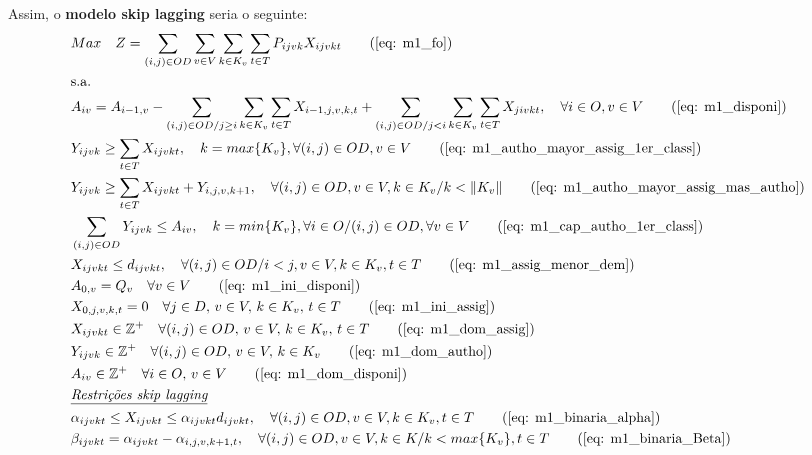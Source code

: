Assim, o \textbf{modelo skip lagging} seria o seguinte:
\allowdisplaybreaks
\begin{align}
	& Max \quad Z = \sum_{(i,j)\in OD} \sum_{v\in V} \sum_{k\in K_v} \sum_{t\in T} P_{ijvk} X_{ijvkt}     \tag{\ref{eq: m1_fo}}   \\
	& \text{s.a.}  \notag \\
	& A_{iv} = A_{i-1,v} - \sum_{(i,j) \in OD/j \geq i} \sum_{k\in K_v}\sum_{t\in T}X_{i-1,j,v,k,t} + \sum_{(i,j) \in OD/j<i} \sum_{k\in K_v}\sum_{t\in T}X_{jivkt}, \quad \forall i \in O, v \in V   \tag{\ref{eq: m1_disponi}} \\
	& Y_{ijvk} \geq  \sum_{t \in T} X_{ijvkt},  \quad k = max\{K_v\}, \forall(i,j) \in OD ,v \in V     \tag{\ref{eq: m1_autho_mayor_assig_1er_class}} \\
	& Y_{ijvk} \geq  \sum_{t \in T} X_{ijvkt} + Y_{i,j,v,k + 1} , \quad \forall(i,j) \in OD, v \in V, k \in K_v / k < \lVert K_v \rVert   \tag{\ref{eq: m1_autho_mayor_assig_mas_autho}} \\
	& \sum_{(i,j) \in OD} Y_{ijvk} \leq A_{iv}, \quad  k = min\{K_v\}, \forall i \in O / (i,j) \in OD,   \forall v \in V       \tag{\ref{eq: m1_cap_autho_1er_class}} \\
	& X_{ijvkt} \leq d_{ijvkt},  \quad \forall (i,j) \in OD / i < j  ,v \in V, k \in K_v, t\in T   \tag{\ref{eq: m1_assig_menor_dem}} \\
	& A_{0,v} = Q_v \quad \forall v \in V  \tag{\ref{eq: m1_ini_disponi}} \\ 
	& X_{0,j,v,k,t} = 0 \quad \forall j \in D,\, v \in V,\, k \in K_v,\, t \in T  \tag{\ref{eq: m1_ini_assig}} \\ 
	& X_{ijvkt} \in \mathbb{Z}^+ \quad \forall(i,j) \in OD,\, v \in V,\, k \in K_v,\, t \in T  \tag{\ref{eq: m1_dom_assig}} \\ 
	& Y_{ijvk} \in \mathbb{Z}^+ \quad \forall(i,j) \in OD,\, v \in V,\, k \in K_v  \tag{\ref{eq: m1_dom_autho}} \\ 
	& A_{iv} \in \mathbb{Z}^+ \quad \forall i \in O,\, v \in V  \tag{\ref{eq: m1_dom_disponi}} \\
	& \textit{\underline{Restrições skip lagging}}         \notag   \\
	& \alpha_{ijvkt} \leq X_{ijvkt} \leq \alpha_{ijvkt}d_{ijvkt}, \quad   \forall(i,j) \in OD, v \in V, k \in K_v, t \in T   \tag{\ref{eq: m1_binaria_alpha}} \\
	& \beta_{ijvkt} = \alpha_{ijvkt} - \alpha_{i,j,v,k+1,t}, \quad \forall (i,j) \in OD, v \in V, k \in K /k < max\{K_v\}, t\in T    \tag{\ref{eq: m1_binaria_Beta}}   \\

\end{align}
